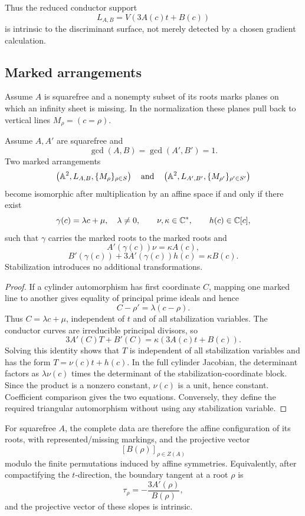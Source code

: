 Thus the reduced conductor support
\[
L_{A,B}=V(3A(c)t+B(c))
\]
is intrinsic to the discriminant surface, not merely detected by a chosen
gradient calculation.

\subsection{Marked arrangements}

Assume \(A\) is squarefree and a nonempty subset of its roots marks planes
on which an infinity sheet is missing.  In the normalization these planes
pull back to vertical lines \(M_\rho=(c=\rho)\).

\begin{theorem}
\label{thm:conductor-arrangement-classification}
Assume \(A,A'\) are squarefree and
\[
\gcd(A,B)=\gcd(A',B')=1.
\]
Two marked arrangements
\[
\left(\mathbb A^2,L_{A,B},\{M_\rho\}_{\rho\in S}\right)
\quad\text{and}\quad
\left(\mathbb A^2,L_{A',B'},\{M_{\rho'}\}_{\rho'\in S'}\right)
\]
become isomorphic after multiplication by an affine space if and only if
there exist
\[
\gamma(c)=\lambda c+\mu,\quad \lambda\ne0,\qquad
\nu,\kappa\in\mathbb C^*,\qquad h(c)\in\mathbb C[c],
\]
such that \(\gamma\) carries the marked roots to the marked roots and
\[
A'(\gamma(c))\nu=\kappa A(c),
\]
\[
B'(\gamma(c))+3A'(\gamma(c))h(c)=\kappa B(c).
\]
Stabilization introduces no additional transformations.
\end{theorem}

\begin{proof}
If a cylinder automorphism has first coordinate \(C\), mapping one marked
line to another gives equality of principal prime ideals and hence
\[
C-\rho'=\lambda(c-\rho).
\]
Thus \(C=\lambda c+\mu\), independent of \(t\) and of all stabilization
variables.  The conductor curves are irreducible principal divisors, so
\[
3A'(C)T+B'(C)=\kappa(3A(c)t+B(c)).
\]
Solving this identity shows that \(T\) is independent of all stabilization
variables and has the form \(T=\nu(c)t+h(c)\).  In the full cylinder
Jacobian, the determinant factors as \(\lambda\nu(c)\) times the determinant
of the stabilization-coordinate block.  Since the product is a nonzero
constant, \(\nu(c)\) is a unit, hence constant.
Coefficient comparison gives the two equations.  Conversely, they define
the required triangular automorphism without using any stabilization
variable.
\end{proof}

For squarefree \(A\), the complete data are therefore the affine
configuration of its roots, with represented/missing markings, and the
projective vector
\[
[B(\rho)]_{\rho\in Z(A)}
\]
modulo the finite permutations induced by affine symmetries.  Equivalently,
after compactifying the \(t\)-direction, the boundary tangent at a root
\(\rho\) is
\[
\tau_\rho=-\frac{3A'(\rho)}{B(\rho)},
\]
and the projective vector of these slopes is intrinsic.

